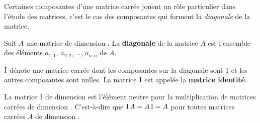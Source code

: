 {Certaines composantes d'une matrice carrée jouent un rôle particulier
dans l'étude des matrices, c'est le cas des composantes qui forment la
{\em diagonale} de la matrice. 

\begin{defn} 
Soit $A$ une matrice de dimension \nn.  La {\bfseries diagonale} de la
matrice $A$ est l'ensemble des éléments $a_{1,1}$, $a_{2,2}$, \ldots,
$a_{n,n}$ de $A$.
\end{defn}

\begin{defn} 
$\operatorname{I}$ dénote une matrice carrée dont les composantes sur la diagonale sont
$1$ et les autres composantes sont nulles.  La matrice $\operatorname{I}$ est appelée la
{\bfseries matrice identité}.
\end{defn}

\begin{prop}
La matrice $\operatorname{I}$ de dimension \nn est l'élément neutre pour la
multiplication de matrices carrées de dimension \nn.  C'est-à-dire que
$\operatorname{I} A = A \operatorname{I} = A$ pour toutes matrices carrées $A$ de dimension
\nn.
\end{prop}

}
